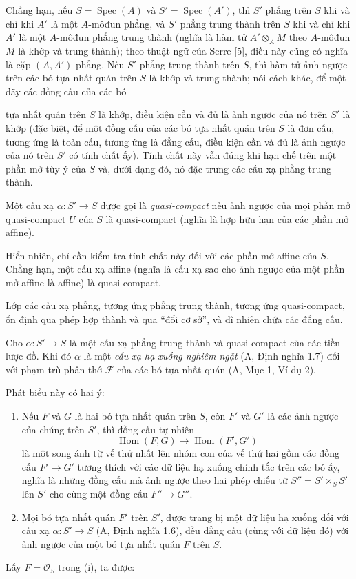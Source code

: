 Chẳng hạn, nếu $S=\operatorname{Spec}(A)$ và
$S'=\operatorname{Spec}(A')$, thì $S'$ phẳng trên $S$ khi và chỉ khi $A'$ là
một $A$-môđun phẳng, và $S'$ phẳng trung thành trên $S$ khi và chỉ khi $A'$ là
một $A$-môđun phẳng trung thành (nghĩa là hàm tử $A'\otimes_A M$ theo
$A$-môđun $M$ là khớp và trung thành); theo thuật ngữ của Serre [5], điều này
cũng có nghĩa là cặp $(A,A')$ phẳng. Nếu $S'$ phẳng trung thành trên $S$, thì
hàm tử ảnh ngược trên các bó tựa nhất quán trên $S$ là khớp và trung thành;
nói cách khác, để một dãy các đồng cấu của các bó

tựa nhất quán trên $S$ là khớp, điều kiện cần và đủ là ảnh ngược của nó trên
$S'$ là khớp (đặc biệt, để một đồng cấu của các bó tựa nhất quán trên $S$ là
đơn cấu, tương ứng là toàn cấu, tương ứng là đẳng cấu, điều kiện cần và đủ là
ảnh ngược của nó trên $S'$ có tính chất ấy). Tính chất này vẫn đúng khi hạn chế
trên một phần mở tùy ý của $S$ và, dưới dạng đó, nó đặc trưng các cấu xạ phẳng
trung thành.

 Một cấu xạ $\alpha:S'\longrightarrow S$ được gọi là
\emph{quasi-compact} nếu ảnh ngược của mọi phần mở quasi-compact $U$ của $S$
là quasi-compact (nghĩa là hợp hữu hạn của các phần mở affine).

Hiển nhiên, chỉ cần kiểm tra tính chất này đối với các phần mở affine của $S$.
Chẳng hạn, một cấu xạ affine (nghĩa là cấu xạ sao cho ảnh ngược của một phần mở
affine là affine) là quasi-compact.

Lớp các cấu xạ phẳng, tương ứng phẳng trung thành, tương ứng quasi-compact, ổn
định qua phép hợp thành và qua ``đổi cơ sở'', và dĩ nhiên chứa các đẳng cấu.

 Cho $\alpha:S'\longrightarrow S$ là một cấu xạ phẳng trung
thành và quasi-compact của các tiền lược đồ. Khi đó $\alpha$ là một \emph{cấu
xạ hạ xuống nghiêm ngặt} (A, Định nghĩa 1.7) đối với phạm trù phân thớ
$\mathcal F$ của các bó tựa nhất quán (A, Mục 1, Ví dụ 2).

Phát biểu này có hai ý:
\begin{enumerate}
\item[(i)] Nếu $F$ và $G$ là hai bó tựa nhất quán trên $S$, còn $F'$ và $G'$
là các ảnh ngược của chúng trên $S'$, thì đồng cấu tự nhiên
\[
  \operatorname{Hom}(F,G)\longrightarrow\operatorname{Hom}(F',G')
\]
là một song ánh từ vế thứ nhất lên nhóm con của vế thứ hai gồm các đồng cấu
$F'\longrightarrow G'$ tương thích với các dữ liệu hạ xuống chính tắc trên các
bó ấy, nghĩa là những đồng cấu mà ảnh ngược theo hai phép chiếu từ
$S''=S'\times_SS'$ lên $S'$ cho cùng một đồng cấu
$F''\longrightarrow G''$.
\item[(ii)] Mọi bó tựa nhất quán $F'$ trên $S'$, được trang bị một dữ liệu hạ
xuống đối với cấu xạ $\alpha:S'\longrightarrow S$ (A, Định nghĩa 1.6), đều
đẳng cấu (cùng với dữ liệu đó) với ảnh ngược của một bó tựa nhất quán $F$ trên
$S$.
\end{enumerate}
Lấy $F=\mathcal O_S$ trong (i), ta được:

